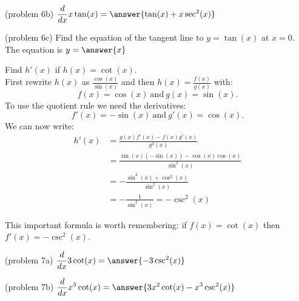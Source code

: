 \documentclass[handout]{ximera}
\begin{document}
\begin{problem}(problem 6b)
  $\displaystyle{\frac{d}{dx} x\tan(x)= \answer{\tan(x) + x\sec^2(x)}}$\\
\end{problem}

\begin{problem}(problem 6c)
  Find the equation of the tangent line to $y = \tan(x)$ at $x = 0$.\\
  The equation is $y = \answer{x}$
\end{problem}

\begin{example}[example 7]
Find $h'(x)$ if $h(x) = \cot(x)$.\\
First rewrite $h(x)$ as $\displaystyle{\frac{\cos(x)}{\sin(x)}}$ and then 
$\displaystyle{h(x) = \frac{f(x)}{g(x)}}$ with:
\[f(x) = \cos(x) \ \text{and} \  g(x)= \sin(x).\]
To use the quotient rule we need the derivatives:
\[f'(x) = -\sin(x) \ \text{and} \  g'(x) =\cos(x).\]
We can now write: 
\begin{align*}
h'(x) &= \frac{g(x)f'(x) - f(x)g'(x)}{g^2(x)}\\
&= \frac{\sin(x)(-\sin(x)) -\cos(x)\cos(x) }{\sin^2(x)}\\
&= -\frac{\sin^2(x)+ \cos^2(x)}{\sin^2(x)}\\
&= -\frac{1}{\sin^2(x)} = -\csc^2(x)
\end{align*}

This important formula is worth remembering: if $f(x) = \cot(x)$ then $f'(x) =-\csc^2(x)$.
\end{example}



\begin{center}
\begin{foldable}
\end{foldable}
\end{center}


\begin{problem}(problem 7a)
  $\displaystyle{\frac{d}{dx} 3\cot(x)= \answer{-3\csc^2(x)}}$\\
\end{problem}

\begin{problem}(problem 7b)
  $\displaystyle{\frac{d}{dx} x^3\cot(x)= \answer{3x^2\cot(x) - x^3\csc^2(x)}}$\\
\end{problem}
\end{document}
